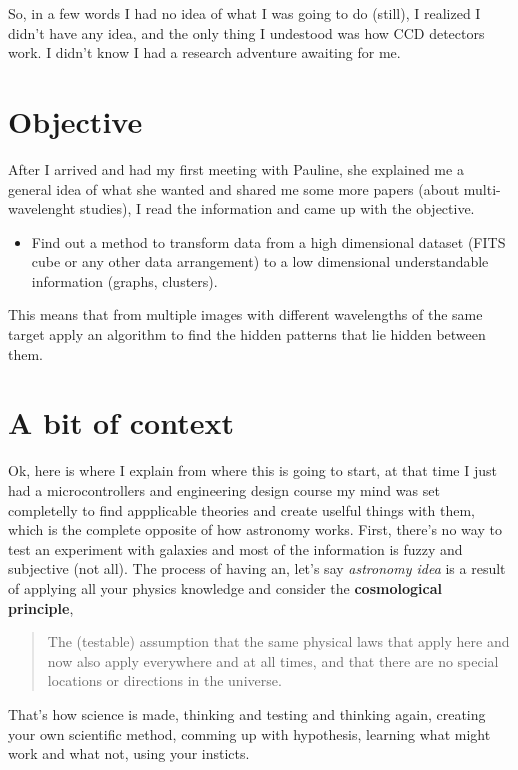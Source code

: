 \documentclass[11pt,fleqn]{book} %
\begin{document}
So, in a few words I had no idea of what I was going to do (still), I realized I didn't have any idea, and the only thing I undestood was how CCD detectors work. I didn't know I had a research adventure awaiting for me.

\section{Objective}
After I arrived and had my first meeting with Pauline, she explained me a general idea of what she wanted and shared me some more papers (about multi-wavelenght studies), I read the information and came up with the objective.

\begin{itemize}
\item Find out a method to transform data from a high dimensional dataset (FITS cube or any other data arrangement) to a low dimensional understandable information (graphs, clusters).
\end{itemize}

This means that from multiple images with different wavelengths of the same target apply an algorithm to find the hidden patterns that lie hidden between them.

\section{A bit of context}
Ok, here is where I explain from where this is going to start, at that time I just had a microcontrollers and engineering design course my mind was set completelly to find appplicable theories and create uselful things with them, which is the complete opposite of how astronomy works. First, there's no way to test an experiment with galaxies and most of the information is fuzzy and subjective (not all). The process of having an, let's say \emph{astronomy idea} is a result of applying all your physics knowledge and consider the \textbf{cosmological principle},
\begin{quote}
The (testable) assumption that the same physical laws that apply here and now also apply everywhere and at all times, and that there are no special locations or directions in the universe.
\end{quote}

That's how science is made, thinking and testing and thinking again, creating your own scientific method, comming up with hypothesis, learning what might work and what not, using your insticts. 
\end{document}
